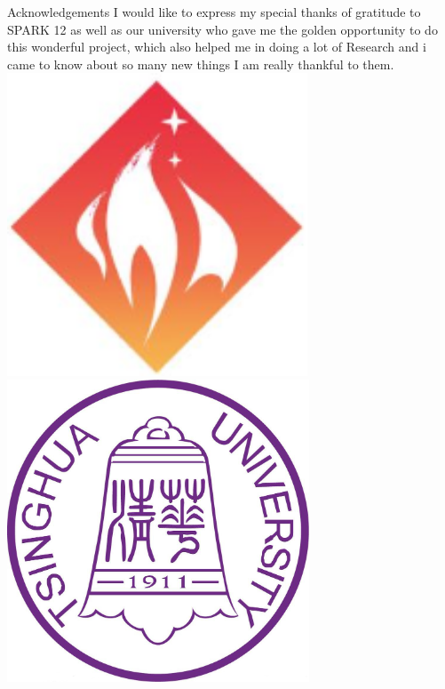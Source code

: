 \documentclass[final]{beamer}
\begin{document}
\begin{frame}[t, fragile = singleslide]{}
\begin{columns}[t]
\begin{column}{0.45\textwidth}
\begin{block}{Acknowledgements}
\footnotesize
I would like to express my special thanks of gratitude to SPARK 12 as well as our university who gave me the golden opportunity to do this wonderful project, which also helped me in doing a lot of Research and i came to know about so many new things I am really thankful to them.
\vfill
\includegraphics[height = 90mm]{./Logos/logo-event.png}
\hspace*{15mm}
\includegraphics[height = 90mm]{./Logos/logo-tsinghua.jpg}

\end{block}

\end{column}

\end{columns}

\begin{columns}[t]

\begin{column}{0.945\textwidth}
\vfill

\end{column}

\end{columns}

\end{frame}

\end{document}
